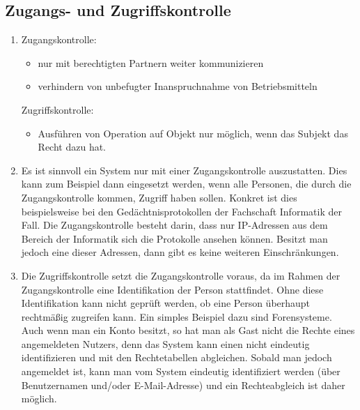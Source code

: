\documentclass[ngerman]{fbi-aufgabenblatt}
\begin{document}


	\subsection{Zugangs- und Zugriffskontrolle}
	
	\begin{enumerate}
		\item
		Zugangskontrolle: 
		\begin{itemize}
			\item nur mit berechtigten Partnern weiter kommunizieren
			\item verhindern von unbefugter Inanspruchnahme von Betriebsmitteln
		\end{itemize}
		Zugriffskontrolle: 
		\begin{itemize}
			\item Ausführen von Operation auf Objekt nur möglich, wenn das Subjekt das Recht dazu hat.
		\end{itemize}

		\item
		Es ist sinnvoll ein System nur mit einer Zugangskontrolle auszustatten. Dies kann zum Beispiel dann eingesetzt werden, wenn alle Personen, die durch die Zugangskontrolle kommen, Zugriff haben sollen. Konkret ist dies beispielsweise bei den Gedächtnisprotokollen der Fachschaft Informatik der Fall. Die Zugangskontrolle besteht darin, dass nur IP-Adressen aus dem Bereich der Informatik sich die Protokolle ansehen können. Besitzt man jedoch eine dieser Adressen, dann gibt es keine weiteren Einschränkungen.
		
		\item 
		Die Zugriffskontrolle setzt die Zugangskontrolle voraus, da im Rahmen der Zugangskontrolle eine Identifikation der Person stattfindet. Ohne diese Identifikation kann nicht geprüft werden, ob eine Person überhaupt rechtmäßig zugreifen kann. Ein simples Beispiel dazu sind Forensysteme. Auch wenn man ein Konto besitzt, so hat man als Gast nicht die Rechte eines angemeldeten Nutzers, denn das System kann einen nicht eindeutig identifizieren und mit den Rechtetabellen abgleichen.
		Sobald man jedoch angemeldet ist, kann man vom System eindeutig identifiziert werden (über Benutzernamen und/oder E-Mail-Adresse) und ein Rechteabgleich ist daher möglich.
		

\end{enumerate}
\end{document}
